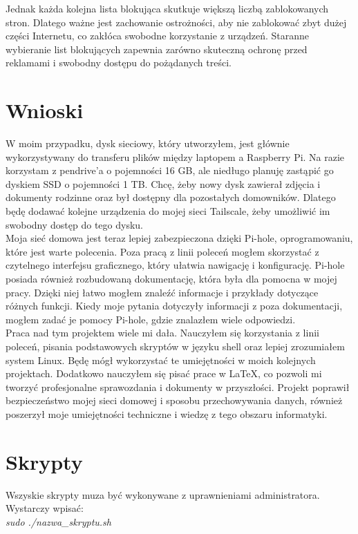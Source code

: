 \documentclass{article}
\begin{document}
Jednak każda kolejna lista blokująca skutkuje większą liczbą zablokowanych stron. Dlatego ważne jest zachowanie ostrożności, aby nie zablokować zbyt dużej części Internetu, co zakłóca swobodne korzystanie z urządzeń. Staranne wybieranie list blokujących zapewnia zarówno skuteczną ochronę przed reklamami i swobodny dostępu do pożądanych treści.
\section{Wnioski}

W moim przypadku, dysk sieciowy, który utworzyłem, jest głównie wykorzystywany do transferu plików między laptopem a Raspberry Pi. Na razie korzystam z pendrive’a o pojemności 16 GB, ale niedługo planuję zastąpić go dyskiem SSD o pojemności 1 TB. Chcę, żeby nowy dysk zawierał zdjęcia i dokumenty rodzinne oraz był dostępny dla pozostałych domowników. Dlatego będę dodawać kolejne urządzenia do mojej sieci Tailscale, żeby umożliwić im swobodny dostęp do tego dysku.\\

Moja sieć domowa jest teraz lepiej zabezpieczona dzięki Pi-hole, oprogramowaniu, które jest warte polecenia. Poza pracą z linii poleceń mogłem skorzystać z czytelnego interfejsu graficznego, który ułatwia nawigację i konfigurację. Pi-hole posiada również rozbudowaną dokumentację, która była dla pomocna w mojej pracy. Dzięki niej łatwo mogłem znaleźć informacje i przykłady dotyczące różnych funkcji. Kiedy moje pytania dotyczyły informacji z poza dokumentacji, mogłem zadać je pomocy Pi-hole, gdzie znalazłem wiele odpowiedzi.\\

Praca nad tym projektem wiele mi dała. Nauczyłem się korzystania z linii poleceń, pisania podstawowych skryptów w języku shell oraz lepiej zrozumiałem system Linux. Będę mógł wykorzystać te umiejętności w moich kolejnych projektach. Dodatkowo nauczyłem się pisać prace w LaTeX, co pozwoli mi tworzyć profesjonalne sprawozdania i dokumenty w przyszłości. Projekt poprawił bezpieczeństwo mojej sieci domowej i sposobu przechowywania danych, również poszerzył moje umiejętności techniczne i wiedzę z tego obszaru informatyki.



\clearpage
\section*{Skrypty}
Wszyskie skrypty muza być wykonywane z uprawnieniami administratora. Wystarczy wpisać:\\
\textit{sudo ./nazwa\_skryptu.sh}\cite{ytScript}
\end{document}
